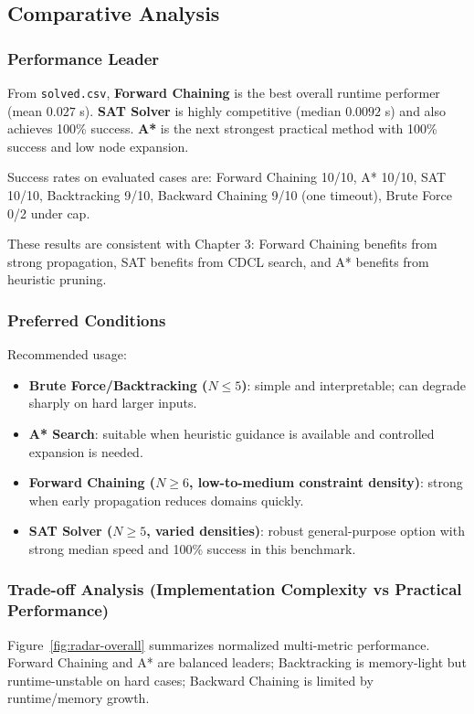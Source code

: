 \subsection{Comparative Analysis}

\subsubsection{Performance Leader}
From \texttt{solved.csv}, \textbf{Forward Chaining} is the best overall runtime performer (mean \(0.027\) s). \textbf{SAT Solver} is highly competitive (median \(0.0092\) s) and also achieves 100\% success. \textbf{A*} is the next strongest practical method with 100\% success and low node expansion.

Success rates on evaluated cases are: Forward Chaining 10/10, A* 10/10, SAT 10/10, Backtracking 9/10, Backward Chaining 9/10 (one timeout), Brute Force 0/2 under cap.

These results are consistent with Chapter 3: Forward Chaining benefits from strong propagation, SAT benefits from CDCL search, and A* benefits from heuristic pruning.

\subsubsection{Preferred Conditions}
Recommended usage:
\begin{itemize}
\item \textbf{Brute Force/Backtracking (\(N \leq 5\))}: simple and interpretable; can degrade sharply on hard larger inputs.
\item \textbf{A* Search}: suitable when heuristic guidance is available and controlled expansion is needed.
\item \textbf{Forward Chaining (\(N \geq 6\), low-to-medium constraint density)}: strong when early propagation reduces domains quickly.
\item \textbf{SAT Solver (\(N \geq 5\), varied densities)}: robust general-purpose option with strong median speed and 100\% success in this benchmark.
\end{itemize}

\subsubsection{Trade-off Analysis (Implementation Complexity vs Practical Performance)}
Figure~\ref{fig:radar-overall} summarizes normalized multi-metric performance. Forward Chaining and A* are balanced leaders; Backtracking is memory-light but runtime-unstable on hard cases; Backward Chaining is limited by runtime/memory growth.

